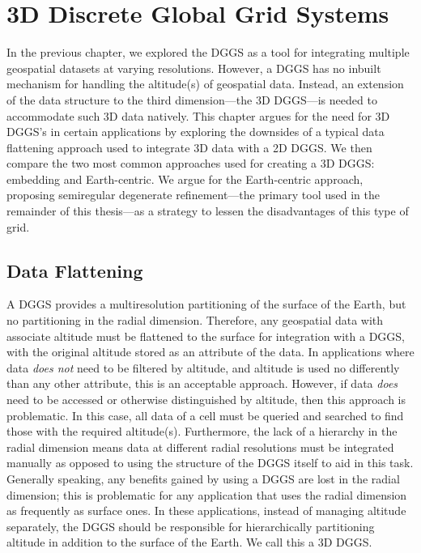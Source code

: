 \chapter{3D Discrete Global Grid Systems} \label{chap:3ddggs}
In the previous chapter, we explored the DGGS as a tool for integrating multiple geospatial datasets at varying resolutions.
However, a DGGS has no inbuilt mechanism for handling the altitude(s) of geospatial data.
Instead, an extension of the data structure to the third dimension---the 3D DGGS---is needed to accommodate such 3D data natively.
This chapter argues for the need for 3D DGGS's in certain applications by exploring the downsides of a typical data flattening approach used to integrate 3D data with a 2D DGGS.
We then compare the two most common approaches used for creating a 3D DGGS: embedding and Earth-centric.
We argue for the Earth-centric approach, proposing semiregular degenerate refinement---the primary tool used in the remainder of this thesis---as a strategy to lessen the disadvantages of this type of grid.


\section{Data Flattening}
A DGGS provides a multiresolution partitioning of the surface of the Earth, but no partitioning in the radial dimension.
Therefore, any geospatial data with associate altitude must be flattened to the surface for integration with a DGGS, with the original altitude stored as an attribute of the data.
In applications where data \textit{does not} need to be filtered by altitude, and altitude is used no differently than any other attribute, this is an acceptable approach.
However, if data \textit{does} need to be accessed or otherwise distinguished by altitude, then this approach is problematic.
In this case, all data of a cell must be queried and searched to find those with the required altitude(s).
Furthermore, the lack of a hierarchy in the radial dimension means data at different radial resolutions must be integrated manually as opposed to using the structure of the DGGS itself to aid in this task.
Generally speaking, any benefits gained by using a DGGS are lost in the radial dimension; this is problematic for any application that uses the radial dimension as frequently as surface ones.
In these applications, instead of managing altitude separately, the DGGS should be responsible for hierarchically partitioning altitude in addition to the surface of the Earth.
We call this a 3D DGGS.


